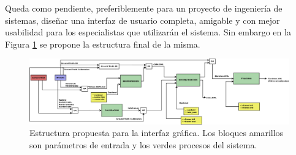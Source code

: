 Queda como pendiente, preferiblemente para un proyecto de ingeniería de sistemas, diseñar una interfaz de usuario completa, amigable y con mejor usabilidad para los especialistas que utilizarán el sistema. Sin embargo en la Figura \ref{gui_estructura} se propone la estructura final de la misma.

\begin{figure}[ht!]
\centering
\vspace{-3cm}
\includegraphics[angle =90,  scale=0.26]{img/Sistema_completo/Flujo_GUI2.png}
\caption{Estructura propuesta para la interfaz gráfica. Los bloques amarillos son parámetros de entrada y los verdes procesos del sistema.}
\label{gui_estructura}
\end{figure}
